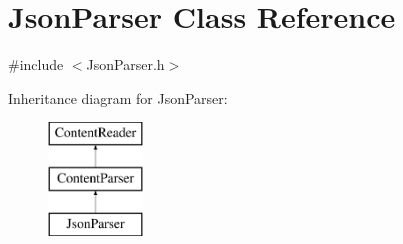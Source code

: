 \hypertarget{classJsonParser}{}\section{Json\+Parser Class Reference}
\label{classJsonParser}


{\ttfamily \#include $<$Json\+Parser.\+h$>$}

Inheritance diagram for Json\+Parser\+:\begin{figure}[H]
\begin{center}
\leavevmode
\includegraphics[height=3.000000cm]{classJsonParser}
\end{center}
\end{figure}
